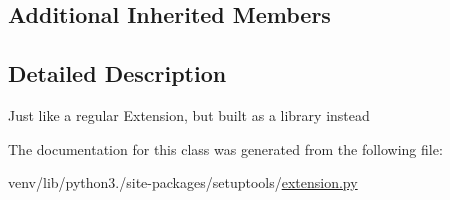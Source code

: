 \subsection*{Additional Inherited Members}


\subsection{Detailed Description}
\begin{DoxyVerb}Just like a regular Extension, but built as a library instead\end{DoxyVerb}
 

The documentation for this class was generated from the following file\+:\begin{DoxyCompactItemize}
\item 
venv/lib/python3./site-\/packages/setuptools/\hyperlink{setuptools_2extension_8py}{extension.\+py}\end{DoxyCompactItemize}
